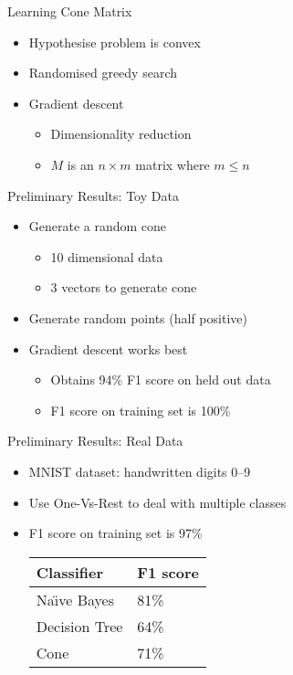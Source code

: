 \documentclass{beamer}
\newlength{\wideitemsep}
\let\olditem\item
\renewcommand{\item}{\setlength{\itemsep}{\wideitemsep}\olditem}
\begin{document}
\begin{frame}{Learning Cone Matrix}
\begin{itemize}
\item Hypothesise problem is convex
\item Randomised greedy search
\item Gradient descent
\begin{itemize}
\item Dimensionality reduction
\item $M$ is an $n\times m$ matrix where $m \le n$
\end{itemize}
\end{itemize}
\end{frame}

\begin{frame}{Preliminary Results: Toy Data}
\begin{itemize}
\item Generate a random cone
\begin{itemize}
\item 10 dimensional data
\item 3 vectors to generate cone
\end{itemize}
\item Generate random points (half positive)
\item Gradient descent works best
\begin{itemize}
\item Obtains 94\% F1 score on held out data
\item F1 score on training set is 100\%
\end{itemize}
\end{itemize}
\end{frame}

\begin{frame}{Preliminary Results: Real Data}
\begin{itemize}
\item MNIST dataset: handwritten digits 0--9
\item Use One-Vs-Rest to deal with multiple classes
\item F1 score on training set is 97\%
\begin{center}
\begin{tabular}{ll}
Classifier & F1 score \\
\hline
Na\"\i ve Bayes & 81\% \\
Decision Tree & 64\% \\
Cone & 71\%
\end{tabular}
\end{center}
\end{itemize}
\end{frame}
\end{document}
